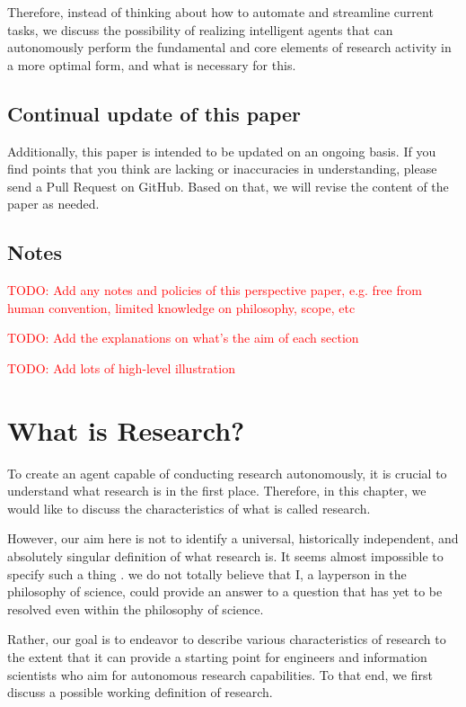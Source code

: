 \documentclass{book}
\begin{document}
Therefore, instead of thinking about how to automate and streamline current tasks, we discuss the possibility of realizing intelligent agents that can autonomously perform the fundamental and core elements of research activity in a more optimal form, and what is necessary for this.

\section{Continual update of this paper}

Additionally, this paper is intended to be updated on an ongoing basis. If you find points that you think are lacking or inaccuracies in understanding, please send a Pull Request on GitHub. Based on that, we will revise the content of the paper as needed.

\section{Notes}
\textcolor{red}{TODO: Add any notes and policies of this perspective paper, e.g. free from human convention, limited knowledge on philosophy, scope, etc}

\textcolor{red}{TODO: Add the explanations on what's the aim of each section}

\textcolor{red}{TODO: Add lots of high-level illustration}

\chapter{What is Research?}

To create an agent capable of conducting research autonomously, it is crucial to understand what research is in the first place. Therefore, in this chapter, we would like to discuss the characteristics of what is called research.

However, our aim here is not to identify a universal, historically independent, and absolutely singular definition of what research is. It seems almost impossible to specify such a thing \cite{chalmers2013thing,sep-scientific-method}. we do not totally believe that I, a layperson in the philosophy of science, could provide an answer to a question that has yet to be resolved even within the philosophy of science.

Rather, our goal is to endeavor to describe various characteristics of research to the extent that it can provide a starting point for engineers and information scientists who aim for autonomous research capabilities. To that end, we first discuss a possible working definition of research.
\end{document}
